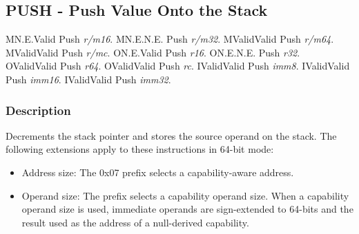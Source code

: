 \clearpage
{}
{}
\subsection*{PUSH - Push Value Onto the Stack}

\begin{x86opcodetable}
  {M}{N.E.}{Valid}
  {Push \emph{r/m16}.}
  {M}{N.E.}{N.E.}
  {Push \emph{r/m32}.}
  {M}{Valid}{Valid}
  {Push \emph{r/m64}.}
  {M}{Valid}{Valid}
  {Push \emph{r/mc}.}
  {O}{N.E.}{Valid}
  {Push \emph{r16}.}
  {O}{N.E.}{N.E.}
  {Push \emph{r32}.}
  {O}{Valid}{Valid}
  {Push \emph{r64}.}
  {O}{Valid}{Valid}
  {Push \emph{rc}.}
  {I}{Valid}{Valid}
  {Push \emph{imm8}.}
  {I}{Valid}{Valid}
  {Push \emph{imm16}.}
  {I}{Valid}{Valid}
  {Push \emph{imm32}.}
\end{x86opcodetable}

\begin{x86opentable}
\end{x86opentable}

\subsubsection*{Description}

Decrements the stack pointer and stores the source operand on the
stack.  The following extensions apply to these instructions in 64-bit
mode:

\begin{itemize}
  \item Address size: The 0x07 prefix selects a capability-aware
    address.

  \item Operand size: The  prefix selects a capability
    operand size.  When a capability operand size is used, immediate
    operands are sign-extended to 64-bits and the result used as the
    address of a null-derived capability.
\end{itemize}

